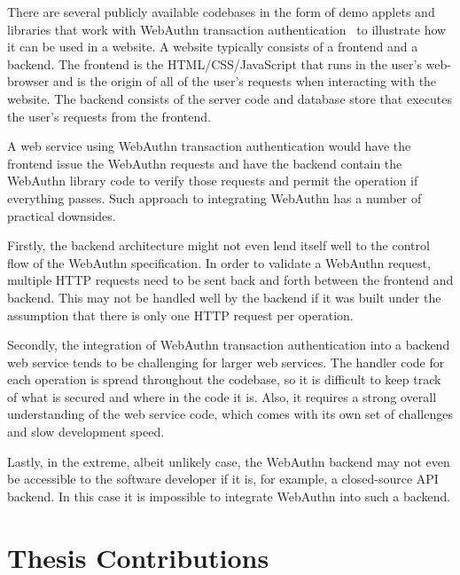 
There are several publicly available codebases in the form of demo applets and libraries that work with WebAuthn transaction authentication~\cite{webauthn-online-examples} to illustrate how it can be used in a website. A website typically consists of a frontend and a backend. The frontend is the HTML/CSS/JavaScript that runs in the user's web-browser and is the origin of all of the user's requests when interacting with the website. The backend consists of the server code and database store that executes the user's requests from the frontend. 

A web service using WebAuthn transaction authentication would have the frontend issue the WebAuthn requests and have the backend contain the WebAuthn library code to verify those requests and permit the operation if everything passes. Such approach to integrating WebAuthn has a number of practical downsides. 


Firstly, the backend architecture might not even lend itself well to the control flow of the WebAuthn specification. In order to validate a WebAuthn request, multiple HTTP requests need to be sent back and forth between the frontend and backend. This may not be handled well by the backend if it was built under the assumption that there is only one HTTP request per operation.

Secondly, the integration of WebAuthn transaction authentication into a backend web service tends to be challenging for larger web services. The handler code for each operation is spread throughout the codebase, so it is difficult to keep track of what is secured and where in the code it is. Also, it requires a strong overall understanding of the web service code, which comes with its own set of challenges and slow development speed.

Lastly, in the extreme, albeit unlikely case, the WebAuthn backend may not even be accessible to the software developer if it is, for example, a closed-source API backend. In this case it is impossible to integrate WebAuthn into such a backend.

\section{Thesis Contributions}

